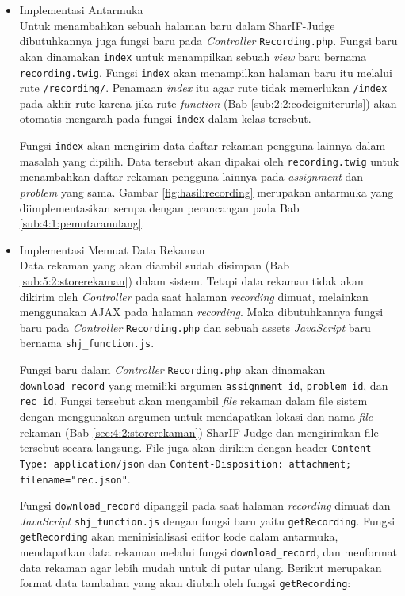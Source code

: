 \begin{itemize}
    \item {Implementasi Antarmuka} \\
    Untuk menambahkan sebuah halaman baru dalam SharIF-Judge dibutuhkannya juga fungsi baru pada \textit{Controller} \verb|Recording.php|. Fungsi baru akan dinamakan \verb|index| untuk menampilkan sebuah \textit{view} baru bernama \verb|recording.twig|. Fungsi \verb|index| akan menampilkan halaman baru itu melalui rute \verb|/recording/|. Penamaan \textit{index} itu agar rute tidak memerlukan \verb|/index| pada akhir rute karena jika rute \textit{function} (Bab \ref{sub:2:2:codeigniterurls}) akan otomatis mengarah pada fungsi \verb|index| dalam kelas tersebut.

    Fungsi \verb|index| akan mengirim data daftar rekaman pengguna lainnya dalam masalah yang dipilih. Data tersebut akan dipakai oleh \verb|recording.twig| untuk menambahkan daftar rekaman pengguna lainnya pada \textit{assignment} dan \textit{problem} yang sama. Gambar \ref{fig:hasil:recording} merupakan antarmuka yang diimplementasikan serupa dengan perancangan pada Bab \ref{sub:4:1:pemutaranulang}.

    \newpage

    \item Implementasi Memuat Data Rekaman \\
    \label{ssub:5:2:4:memuatdata}Data rekaman yang akan diambil sudah disimpan (Bab \ref{sub:5:2:storerekaman}) dalam sistem. Tetapi data rekaman tidak akan dikirim oleh \textit{Controller} pada saat halaman \textit{recording} dimuat, melainkan menggunakan AJAX pada halaman \textit{recording}. Maka dibutuhkannya fungsi baru pada \textit{Controller} \verb|Recording.php| dan sebuah assets \textit{JavaScript} baru bernama \verb|shj_function.js|.

    Fungsi baru dalam \textit{Controller} \verb|Recording.php| akan dinamakan \verb|download_record| yang memiliki argumen \verb|assignment_id|, \verb|problem_id|, dan \verb|rec_id|. Fungsi tersebut akan mengambil \textit{file} rekaman dalam file sistem dengan menggunakan argumen untuk mendapatkan lokasi dan nama \textit{file} rekaman (Bab \ref{sec:4:2:storerekaman}) SharIF-Judge dan mengirimkan file tersebut secara langsung. File juga akan dirikim dengan header \verb|Content-Type: application/json| dan \verb|Content-Disposition: attachment; filename=|\verb|"rec.json"|.

    Fungsi \verb|download_record| dipanggil pada saat halaman \textit{recording} dimuat dan \textit{JavaScript} \verb|shj_function.js| dengan fungsi baru yaitu \verb|getRecording|. Fungsi \verb|getRecording| akan meninisialisasi editor kode dalam antarmuka, mendapatkan data rekaman melalui fungsi \verb|download_record|, dan menformat data rekaman agar lebih mudah untuk di putar ulang. Berikut merupakan format data tambahan yang akan diubah oleh fungsi \verb|getRecording|:


\end{itemize}

